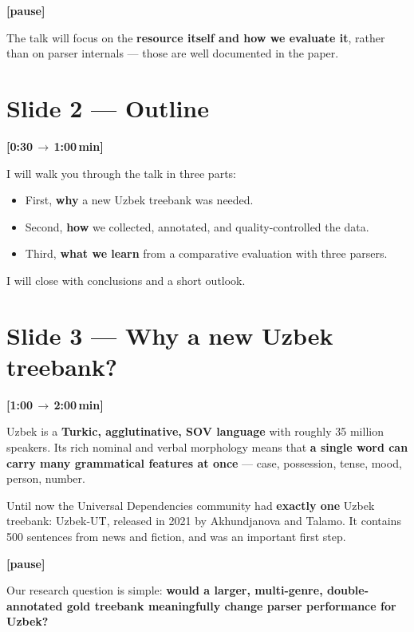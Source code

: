 \documentclass[12pt,a4paper]{article}
\newcommand{\timing}[2]{%
   \par\noindent\textbf{\small [#1\,$\to$\,#2\,min]}\par\vspace{0.2em}}
\newcommand{\say}[1]{\textbf{#1}}
\newcommand{\pause}{\par\vspace{0.4em}\textbf{[pause]}\par}
\begin{document}
\pause

The talk will focus on the \say{resource itself and how we evaluate it}, rather
than on parser internals — those are well documented in the paper.

\section*{Slide 2 — Outline}
\timing{0:30}{1:00}

I will walk you through the talk in three parts:

\begin{itemize}
   \item First, \textbf{why} a new Uzbek treebank was needed.
   \item Second, \textbf{how} we collected, annotated, and quality-controlled the data.
   \item Third, \textbf{what we learn} from a comparative evaluation with three parsers.
\end{itemize}

\noindent
I will close with conclusions and a short outlook.

\section*{Slide 3 — Why a new Uzbek treebank?}
\timing{1:00}{2:00}

Uzbek is a \say{Turkic, agglutinative, SOV language} with roughly
35 million speakers. Its rich nominal and verbal morphology means that
\say{a single word can carry many grammatical features at once} — case,
possession, tense, mood, person, number.

Until now the Universal Dependencies community had \say{exactly one}
Uzbek treebank: Uzbek-UT, released in 2021 by Akhundjanova and Talamo. It
contains 500 sentences from news and fiction, and was an important first
step.

\pause

Our research question is simple: \say{would a larger, multi-genre,
double-annotated gold treebank meaningfully change parser performance for
Uzbek?}

\end{document}
